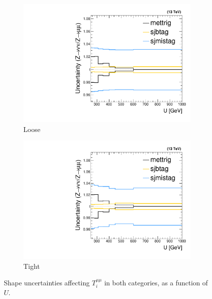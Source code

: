 \begin{figure}[]
    \begin{center}
        \begin{subfigure}[t]{0.49\textwidth}
            \includegraphics[width=\textwidth]{figures/monotop/uncertainties/variations_dimuon_loose.pdf}
            \caption{Loose}
        \end{subfigure}
        \begin{subfigure}[t]{0.49\textwidth}
            \includegraphics[width=\textwidth]{figures/monotop/uncertainties/variations_dimuon.pdf}
            \caption{Tight}
        \end{subfigure}
        \caption{Shape uncertainties affecting $T_i^{\mu\mu}$ in both categories, as a function of $U$.}
        \label{fig:mt:zmm_uncs}
    \end{center}
\end{figure}

